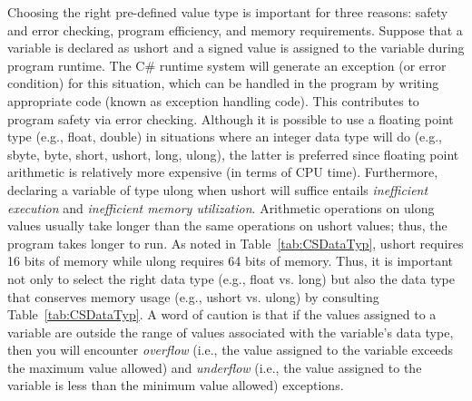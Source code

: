 Choosing the right pre-defined value type is important for three
reasons: safety and error checking, program efficiency, and memory
requirements. Suppose that a variable is declared as ushort and a
signed value is assigned to the variable during program runtime.
The C\# runtime system will generate an exception (or error
condition) for this situation, which can be handled in the program
by writing appropriate code (known as exception handling code).
This contributes to program safety via error checking. Although it
is possible to use a floating point type (e.g., float, double) in
situations where an integer data type will do (e.g., sbyte, byte,
short, ushort, long, ulong), the latter is preferred since
floating point arithmetic is relatively more expensive (in terms
of CPU time). Furthermore, declaring a variable of type ulong when
ushort will suffice entails \emph{inefficient execution} and
\emph{inefficient memory utilization}. Arithmetic operations on
ulong values usually take longer than the same operations on
ushort values; thus, the program takes longer to run. As noted in
Table~\ref{tab:CSDataTyp}, ushort requires 16 bits of memory while
ulong requires 64 bits of memory. Thus, it is important not only
to select the right data type (e.g., float vs. long) but also the
data type that conserves memory usage (e.g., ushort vs. ulong) by
consulting Table~\ref{tab:CSDataTyp}. A word of caution is that if
the values assigned to a variable are outside the range of values
associated with the variable's data type, then you will encounter
\emph{overflow} (i.e., the value assigned to the variable exceeds
the maximum value allowed) and \emph{underflow} (i.e., the value
assigned to the variable is less than the minimum value allowed)
exceptions.




